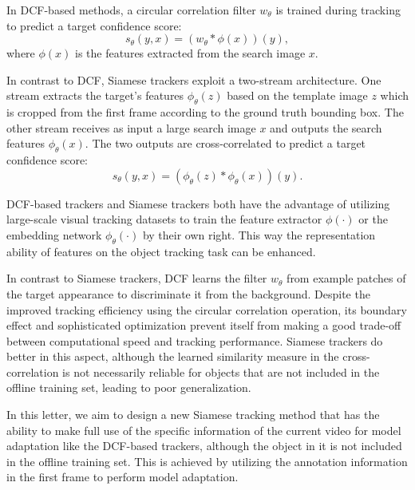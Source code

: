 In DCF-based methods, a circular correlation filter $w_{\theta}$ is trained during tracking to predict a target confidence score:
\begin{equation}
    s_\theta(y,x)=(w_\theta * \phi(x))(y),
    \label{equ:dcf}
\end{equation}
where $\phi(x)$ is the features extracted from the search image $x$.

In contrast to DCF, Siamese trackers exploit a two-stream architecture. One stream extracts the target’s features $\phi_\theta(z)$ based on the template image $z$ which is cropped from the first frame according to the ground truth bounding box. The other stream receives as input a large search image $x$ and outputs the search features $\phi_\theta(x)$. The two outputs are cross-correlated to predict a target confidence score:
\begin{equation}
    s_\theta(y,x)=(\phi_\theta(z) * \phi_\theta(x))(y).
    \label{equ:siamese}
\end{equation}

DCF-based trackers and Siamese trackers both have the advantage of utilizing large-scale visual tracking datasets to train the feature extractor $\phi(\cdot)$ or the embedding network $\phi_{\theta}(\cdot)$ by their own right. This way the representation ability of features on the object tracking task can be enhanced. 

In contrast to Siamese trackers, DCF learns the filter $w_\theta$ from example patches of the target appearance to discriminate it from the background.
Despite the improved tracking efficiency using the circular correlation operation, its boundary effect and sophisticated optimization prevent itself from making a good trade-off between computational speed and tracking performance. Siamese trackers do better in this aspect, although the learned similarity measure in the cross-correlation is not necessarily reliable for objects that are not included in the offline training set, leading to poor generalization.

In this letter, we aim to design a new Siamese tracking method that has the ability to make full use of the specific information of the current video for model adaptation like the DCF-based trackers, although the object in it is not included in the offline training set. This is achieved by utilizing the annotation information in the first frame to perform model adaptation.


